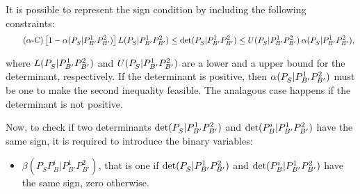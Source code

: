 \documentclass[a4paper]{elsarticle}
\begin{document}
It is possible to represent the sign condition by including the following constraints:
\begin{equation}\tag{$\alpha$-C}\label{eq:alphaC}
\left[1-\alpha(P_S^{}|P_{B'}^1P_{B'}^2)\right]L(P_S^{}|P_{B'}^1P_{B'}^2)\leq\det({P_S^{}|P_{B'}^1P_{B'}^2})\leq U(P_S^{}|P_{B'}^1P_{B'}^2)\:\alpha(P_S^{}|P_{B'}^1P_{B'}^2),
\end{equation}

where $L(P_S^{}|P_{B'}^1P_{B'}^2)$ and $U(P_S^{}|P_{B'}^1P_{B'}^2)$ are a lower and a upper bound for the determinant, respectively. If the determinant is positive, then $\alpha(P_S^{}|P_{B'}^1P_{B'}^2)$ must be one to make the second inequality feasible. The analagous case happens if the determinant is not positive.

\newcommand{\betamas}[4]{\beta(#1#2|#3#4)}

Now, to check if two determinants $\det({P_S^{}|P_{B'}^1P_{B'}^2})$ and $\det({P_B^i|P_{B'}^1P_{B'}^2})$ have the same sign, it is required to introduce the binary variables:

\begin{itemize}
\item $\betamas{P_S^{}}{P_B^i}{P_{B'}^1}{P_{B'}^2}$, that is one if $\det({P_S^{}|P_{B'}^1P_{B'}^2})$ and $\det({P_B^i|P_{B'}^1P_{B'}^2})$ have the same sign, zero otherwise.
\end{itemize}
\end{document}
